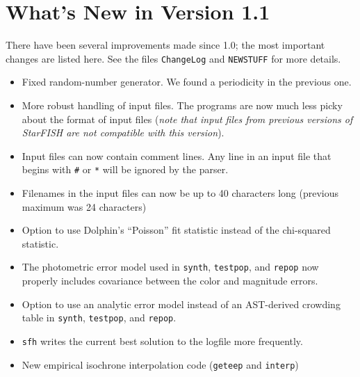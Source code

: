 \documentclass[12pt]{book}
\def\ttg{\tt\color{DarkGreen}}
\def\itr{\it\color{myRed}}
\begin{document}
\clearpage

\section{What's New in Version 1.1}

There have been several improvements made since 1.0; the most 
important changes are listed here.  See the files {\ttg ChangeLog} and 
{\ttg NEWSTUFF} for more details.

\begin{itemize}
\item Fixed random-number generator.  We found a periodicity in 
the previous one. \\

\item More robust handling of input files.  The programs are now 
much less picky about the format of input files ({\itr note that 
input files from previous versions of StarFISH are not compatible 
with this version}). \\

\item Input files can now contain comment lines.  Any line in an 
input file that begins with {\ttg \#} or {\ttg *} will be ignored by 
the parser. \\

\item Filenames in the input files can now be up to 40 characters 
long (previous maximum was 24 characters) \\

\item Option to use Dolphin's ``Poisson'' fit statistic instead of 
the chi-squared statistic. \\

\item The photometric error model used in {\ttg synth}, 
{\ttg testpop}, and {\ttg repop} now properly includes covariance 
between the color and magnitude errors. \\

\item Option to use an analytic error model instead of an 
AST-derived crowding table in {\ttg synth}, {\ttg testpop}, and 
{\ttg repop}. \\

\item {\ttg sfh} writes the current best solution to the logfile more 
frequently. \\

\item New empirical isochrone interpolation code ({\ttg geteep} and 
{\ttg interp})

\end{itemize}
\end{document}
